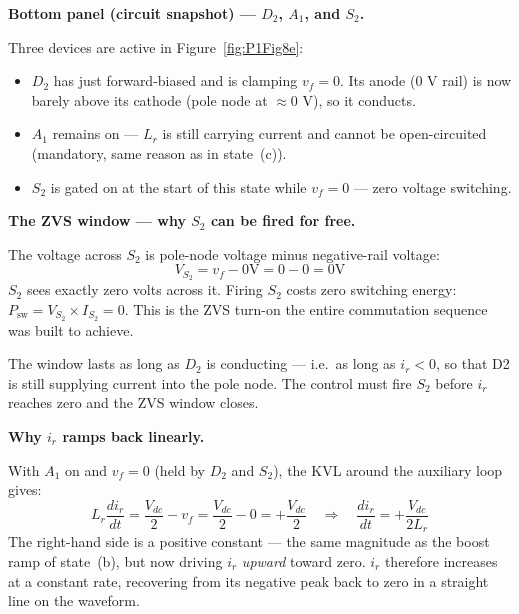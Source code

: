 \documentclass[12pt, a4paper]{article}
\def\,{ }%
\newcommand{\Vdc}{V_{dc}}
\newcommand{\vf}{v_f}
\newcommand{\ir}{i_r}
\newcommand{\Lr}{L_r}
\newcommand{\figref}[1]{Figure~\ref{#1}}
\begin{document}
\medskip
\textbf{Bottom panel (circuit snapshot) --- $D_2$, $A_1$, and $S_2$.}

Three devices are active in \figref{fig:P1Fig8e}:
\begin{itemize}
    \item \textbf{$D_2$} has just forward-biased and is clamping
          $\vf = 0$.
          Its anode (0\,V rail) is now barely above its cathode
          (pole node at $\approx 0$\,V), so it conducts.
    \item \textbf{$A_1$} remains on --- $\Lr$ is still carrying
          current and cannot be open-circuited (mandatory, same reason
          as in state~(c)).
    \item \textbf{$S_2$} is gated on at the start of this state while
          $\vf = 0$ --- zero voltage switching.
\end{itemize}

\medskip
\textbf{The ZVS window --- why $S_2$ can be fired for free.}

The voltage across $S_2$ is pole-node voltage minus negative-rail
voltage:
\begin{equation*}
    V_{S_2} = \vf - 0\,\text{V} = 0 - 0 = 0\,\text{V}
\end{equation*}
$S_2$ sees exactly zero volts across it.
Firing $S_2$ costs zero switching energy: $P_\text{sw} = V_{S_2}
\times I_{S_2} = 0$.
This is the ZVS turn-on the entire commutation sequence was built to
achieve.

The window lasts as long as $D_2$ is conducting --- i.e.\ as long as
$\ir < 0$, so that D2 is still supplying current into the pole node.
The control must fire $S_2$ before $\ir$ reaches zero and the ZVS
window closes.

\medskip
\textbf{Why $\ir$ ramps back linearly.}

With $A_1$ on and $\vf = 0$ (held by $D_2$ and $S_2$), the KVL
around the auxiliary loop gives:
\begin{equation}
    \Lr\,\frac{d\ir}{dt} = \frac{\Vdc}{2} - \vf
                         = \frac{\Vdc}{2} - 0
                         = +\frac{\Vdc}{2}
    \quad\Longrightarrow\quad
    \frac{d\ir}{dt} = +\frac{\Vdc}{2\Lr}
    \label{eq:ir_rampup_fig8}
\end{equation}
The right-hand side is a positive constant --- the same magnitude as
the boost ramp of state~(b), but now driving $\ir$ \emph{upward}
toward zero.
$\ir$ therefore increases at a constant rate, recovering from its
negative peak back to zero in a straight line on the waveform.
\end{document}
